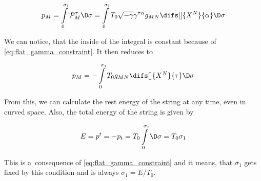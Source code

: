 \begin{equation}
    p_M = \int\limits_0^{\sigma_1} \mathcal{P}^{\tau}_M \D \sigma = \int\limits_0^{\sigma_1} T_0 \sqrt{-\gamma} \gamma^{\tau \alpha} g_{MN} \difs[]{X^N}{\alpha} \D \sigma
\end{equation}

\noindent
We can notice, that the inside of the integral is constant because of \cref{eq:flat_gamma_constraint}. It then reduces to

\begin{equation}
\label{eq:flat_momenta}
    p_M = - \int\limits_0^{\sigma_1} T_0 g_{MN} \difs[]{X^N}{\tau} \D \sigma
\end{equation}

\noindent
From this, we can calculate the rest energy of the string at any time, even in curved space. Also, the total energy of the string is given by

\begin{equation}
    E = p^t = - p_t = T_0 \int\limits_0^{\sigma_1} \D \sigma = T_0 \sigma_1
\end{equation}

\noindent
This is a~consequence of \cref{eq:flat_gamma_constraint} and it means, that $\sigma_1$ gets fixed by this condition and is always $\sigma_1 = E/T_0$.